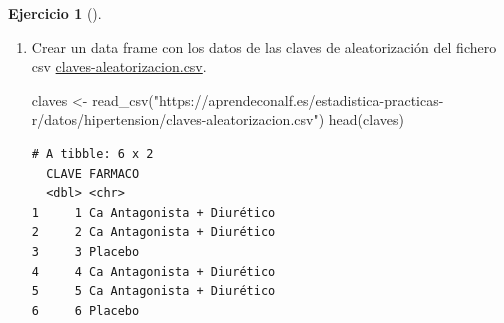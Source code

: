 \documentclass[
  spanish,
  a4paper,
]{scrreport}
\newenvironment{Shaded}{\begin{snugshade}}{\end{snugshade}}
\newcommand{\FunctionTok}[1]{\textcolor[rgb]{0.28,0.35,0.67}{#1}}
\newcommand{\NormalTok}[1]{\textcolor[rgb]{0.00,0.23,0.31}{#1}}
\newcommand{\OtherTok}[1]{\textcolor[rgb]{0.00,0.23,0.31}{#1}}
\newcommand{\StringTok}[1]{\textcolor[rgb]{0.13,0.47,0.30}{#1}}
\theoremstyle{definition}
\newtheorem{exercise}{Ejercicio}[chapter]
\theoremstyle{remark}
\begin{document}
\begin{exercise}[]
\begin{enumerate}
\begin{tcolorbox}
\begin{verbatim}
# A tibble: 6 x 12
  CLAVE NOMBRE F_NACIM             F_INCLUS             SEXO ALTURA  PESO ESTRES
  <dbl> <chr>  <dttm>              <dttm>              <dbl>  <dbl> <dbl>  <dbl>
1     1 SGL    1941-09-08 00:00:00 1998-07-13 00:00:00     1    165    78     42
2     2 JCZ    1957-07-10 00:00:00 1998-05-09 00:00:00     1    154    74     30
3     3 APZ    1967-08-18 00:00:00 2000-04-01 00:00:00     0    156    81     21
4     4 NDG    1956-05-08 00:00:00 1998-11-13 00:00:00     0    181    82     33
5     5 CLO    1958-11-02 00:00:00 1999-02-24 00:00:00     1    184    78     36
6     6 LFZ    1953-06-13 00:00:00 2000-03-16 00:00:00     0    179    80     22
# i 4 more variables: PAD_INI <dbl>, PAD_FIN <dbl>, PAS_INI <dbl>,
#   PAS_FIN <dbl>
\end{verbatim}

  \end{tcolorbox}
\item
  Crear un data frame con los datos de las claves de aleatorización del
  fichero csv
  \href{datos/hipertension/claves-aleatorizacion.csv}{claves-aleatorizacion.csv}.

  \begin{tcolorbox}[enhanced jigsaw, titlerule=0mm, arc=.35mm, rightrule=.15mm, opacitybacktitle=0.6, leftrule=.75mm, colframe=quarto-callout-tip-color-frame, toptitle=1mm, breakable, colbacktitle=quarto-callout-tip-color!10!white, bottomrule=.15mm, colback=white, left=2mm, bottomtitle=1mm, opacityback=0, title=\textcolor{quarto-callout-tip-color}{\faLightbulb}\hspace{0.5em}{Solución}, toprule=.15mm, coltitle=black]

\begin{Shaded}
\begin{Highlighting}[]
\NormalTok{claves }\OtherTok{\textless{}{-}} \FunctionTok{read\_csv}\NormalTok{(}\StringTok{"https://aprendeconalf.es/estadistica{-}practicas{-}r/datos/hipertension/claves{-}aleatorizacion.csv"}\NormalTok{)}
\FunctionTok{head}\NormalTok{(claves)}
\end{Highlighting}
\end{Shaded}

\begin{verbatim}
# A tibble: 6 x 2
  CLAVE FARMACO                   
  <dbl> <chr>                     
1     1 Ca Antagonista + Diurético
2     2 Ca Antagonista + Diurético
3     3 Placebo                   
4     4 Ca Antagonista + Diurético
5     5 Ca Antagonista + Diurético
6     6 Placebo                   
\end{verbatim}


\end{tcolorbox}
\end{enumerate}
\end{exercise}
\end{document}
